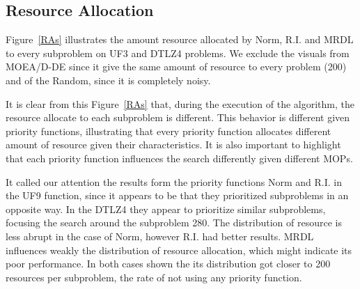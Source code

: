 






\subsection{Resource Allocation}

Figure~\ref{RAs} illustrates the amount resource allocated by Norm, R.I. and MRDL to every subproblem on UF3 and DTLZ4 problems. We exclude the visuals from MOEA/D-DE since it give the same amount of resource to every problem (200) and of the Random, since it is completely noisy. 

It is clear from this Figure~\ref{RAs} that, during the execution of the algorithm, the resource allocate to each subproblem is different. This behavior is different given priority functions, illustrating that every priority function allocates different amount of resource given their characteristics. It is also important to highlight that each priority function influences the search differently given different MOPs.

It called our attention the results form the priority functions Norm and R.I. in the UF9 function, since it appears to be that they prioritized subproblems in an opposite way. In the DTLZ4 they appear to prioritize similar subproblems, focusing the search around the subproblem 280. The distribution of resource is less abrupt in the case of Norm, however R.I. had better results. MRDL influences weakly the distribution of resource allocation, which might indicate its poor performance. In both cases shown the its distribution got closer to 200 resources per subproblem, the rate of not using any priority function. 





